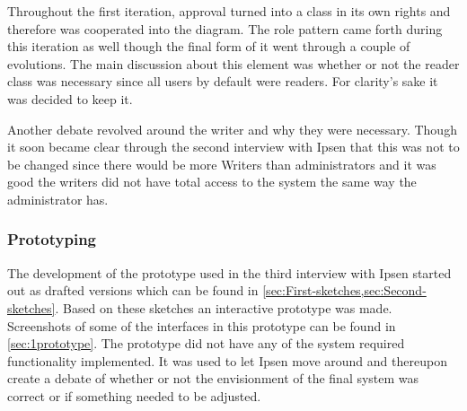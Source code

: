 Throughout the first iteration, approval turned into a class in its own rights and therefore was cooperated into the diagram.
The role pattern came forth during this iteration as well though the final form of it went through a couple of evolutions.
The main discussion about this element was whether or not the reader class was necessary since all users by default were readers.
For clarity's sake it was decided to keep it.

Another debate revolved around the writer and why they were necessary. 
Though it soon became clear through the second interview with Ipsen that this was not to be changed since there would be more Writers than administrators and it was good the writers did not have total access to the system the same way the administrator has.

\subsubsection*{Prototyping}
The development of the prototype used in the third interview with Ipsen started out as drafted versions which can be found in \cref{sec:First-sketches,sec:Second-sketches}.
Based on these sketches an interactive prototype was made. 
Screenshots of some of the interfaces in this prototype can be found in \cref{sec:1prototype}.
The prototype did not have any of the system required functionality implemented.
It was used to let Ipsen move around and thereupon create a debate of whether or not the envisionment of the final system was correct or if something needed to be adjusted.
